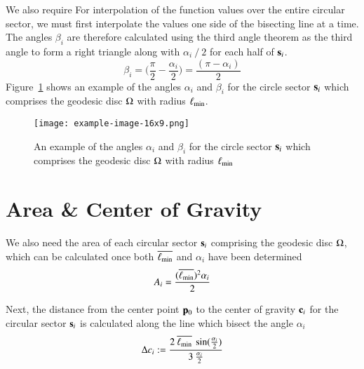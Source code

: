 We also require For interpolation of the function values over the entire circular sector, we must first interpolate the values one side of the bisecting line at a time. The angles $\beta_i$ are therefore calculated using the third angle theorem as the third angle to form a right triangle along with $\alpha_i\mathbin{/}2$ for each half of $\mathbf{s}_i$. 
\begin{equation}
	\beta_i = \Big(\frac{\pi}{2} - \frac{\alpha_i}{2}\Big) = \frac{(\pi - \alpha_i)}{2}
	\label{eq:betaFromHalfAlpha}
\end{equation}%
%
Figure~\ref{fig:angles} shows an example of the angles $\alpha_i$ and $\beta_i$ for the circle sector $\mathbf{s}_i$  which comprises the geodesic disc $\Omega$ with radius $\ell_\text{min}$.
\begin{figure}[ht]
\ffigbox
	{\texttt{[image: example-image-16x9.png]}}
	{\caption[The angles $\alpha_i$ and $\beta_i$]{An example of the angles $\alpha_i$ and $\beta_i$ for the circle sector $\mathbf{s}_i$  which comprises the geodesic disc $\Omega$ with radius $\ell_\text{min}$}\label{fig:angles}}
\end{figure}%
%
%
%
%
%
\section{Area \& Center of Gravity}
\label{ch4sACG}
We also need the area of each circular sector $\mathbf{s}_i$ comprising the geodesic disc $\Omega$, which can be calculated once both $\overline{\ell_\text{min}}$ and $\alpha_i$ have been determined
\begin{equation}
	A_i = \frac{(\overline{\ell_\text{min}})^2\alpha_i}{2}
	\label{eq:circularSectorArea}
\end{equation}
%
%

Next, the distance from the center point $\mathbf{p}_0$ to the center of gravity $\mathbf{c}_i$ for the circular sector $\mathbf{s}_i$ is calculated along the line which bisect the angle $\alpha_i$
\begin{equation}
	\Delta c_i := \frac{2\:\overline{\ell_\text{min}}\:\sin(\frac{\alpha_i}{2})}{3\:\frac{\alpha_i}{2}}
	\label{eq:distToCoG}
\end{equation}
%
%

